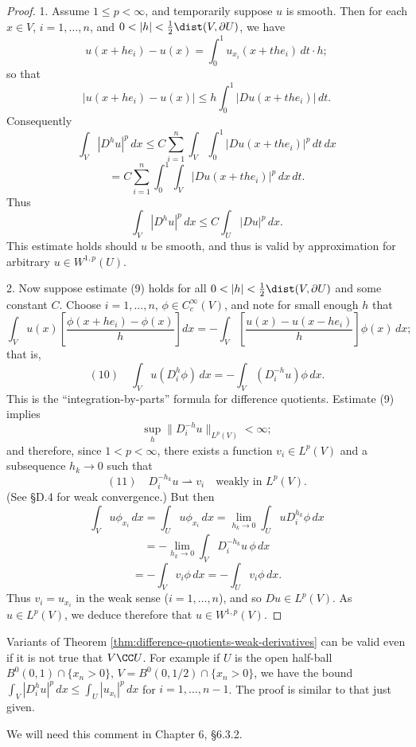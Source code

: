 \begin{proof}
1. Assume $1 \le p < \infty$, and temporarily suppose $u$ is smooth. Then for each $x \in V$, $i = 1, \ldots, n$, and $0 < |h| < \frac{1}{2}\dist(V, \partial U)$, we have
$$u(x + he_i) - u(x) = \int_0^1 u_{x_i}(x + the_i) \, dt \cdot h;$$
so that
$$|u(x + he_i) - u(x)| \le h \int_0^1 |Du(x + the_i)| \, dt.$$
Consequently
$$\int_V |D^h u|^p\,dx \le C \sum_{i=1}^n \int_V \int_0^1 |Du(x + the_i)|^p\,dt\,dx$$
$$= C \sum_{i=1}^n \int_0^1 \int_V |Du(x + the_i)|^p\,dx\,dt.$$
Thus
$$\int_V |D^h u|^p\,dx \le C \int_U |Du|^p\,dx.$$
This estimate holds should $u$ be smooth, and thus is valid by approximation for arbitrary $u \in W^{1,p}(U)$.

2. Now suppose estimate (9) holds for all $0 < |h| < \frac{1}{2}\dist(V, \partial U)$ and some constant $C$. Choose $i = 1, \ldots, n$, $\phi \in C_c^\infty(V)$, and note for small enough $h$ that
$$\int_V u(x) \left[\frac{\phi(x + he_i) - \phi(x)}{h}\right] dx = -\int_V \left[\frac{u(x) - u(x - he_i)}{h}\right] \phi(x)\,dx;$$
that is,
$$(10) \quad \int_V u(D_i^h \phi)\,dx = -\int_V (D_i^{-h} u)\phi\,dx.$$
This is the ``integration-by-parts'' formula for difference quotients. Estimate (9) implies
$$\sup_h \|D_i^{-h} u\|_{L^p(V)} < \infty;$$
and therefore, since $1 < p < \infty$, there exists a function $v_i \in L^p(V)$ and a subsequence $h_k \to 0$ such that
$$(11) \quad D_i^{-h_k} u \rightharpoonup v_i \quad \text{weakly in } L^p(V).$$
(See §D.4 for weak convergence.) But then
$$\int_V u\phi_{x_i}\,dx = \int_U u\phi_{x_i}\,dx = \lim_{h_k\to 0} \int_U u D_i^{h_k}\phi\,dx$$
$$= -\lim_{h_k\to 0} \int_V D_i^{-h_k}u\,\phi\,dx$$
$$= -\int_V v_i\phi\,dx = -\int_U v_i\phi\,dx.$$
Thus $v_i = u_{x_i}$ in the weak sense ($i = 1, \ldots, n$), and so $Du \in L^p(V)$. As $u \in L^p(V)$, we deduce therefore that $u \in W^{1,p}(V)$.
\end{proof}

\begin{remark}
\label{rem:difference-quotient-half-ball-remark}
Variants of Theorem \ref{thm:difference-quotients-weak-derivatives} can be valid even if it is not true that $V \CC U$. For example if $U$ is the open half-ball $B^0(0,1) \cap \{x_n > 0\}$, $V = B^0(0,1/2) \cap \{x_n > 0\}$, we have the bound $\int_V |D_i^h u|^p\,dx \le \int_U |u_{x_i}|^p\,dx$ for $i = 1, \ldots, n-1$. The proof is similar to that just given.

We will need this comment in Chapter 6, §6.3.2.
\end{remark}


